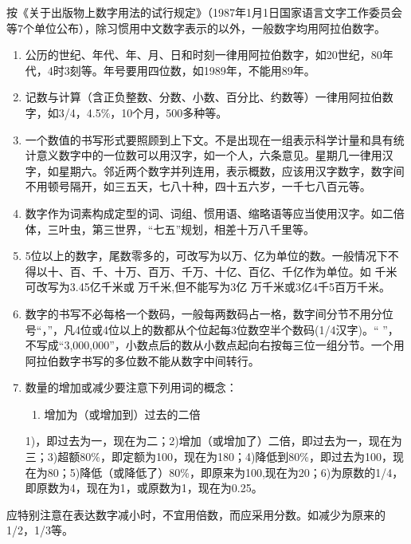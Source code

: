 
按《关于出版物上数字用法的试行规定》（1987年1月1日国家语言文字工作委员会等7个单位公布），除习惯用中文数字表示的以外，一般数字均用阿拉伯数字。
\begin{enumerate}%
	\item 公历的世纪、年代、年、月、日和时刻一律用阿拉伯数字，如20世纪，80年代，4时3刻等。年号要用四位数，如1989年，不能用89年。
	\item 记数与计算（含正负整数、分数、小数、百分比、约数等）一律用阿拉伯数字，如3/4，4.5\%，10个月，500多种等。
	\item 一个数值的书写形式要照顾到上下文。不是出现在一组表示科学计量和具有统计意义数字中的一位数可以用汉字，如一个人，六条意见。星期几一律用汉字，如星期六。邻近两个数字并列连用，表示概数，应该用汉字数字，数字间不用顿号隔开，如三五天，七八十种，四十五六岁，一千七八百元等。
	\item 数字作为词素构成定型的词、词组、惯用语、缩略语等应当使用汉字。如二倍体，三叶虫，第三世界，“七五”规划，相差十万八千里等。
	\item 5位以上的数字，尾数零多的，可改写为以万、亿为单位的数。一般情况下不得以十、百、千、十万、百万、千万、十亿、百亿、千亿作为单位。如 千米可改写为3.45亿千米或 万千米,但不能写为3亿 万千米或3亿4千5百万千米。
	\item 数字的书写不必每格一个数码，一般每两数码占一格，数字间分节不用分位号“，”，凡4位或4位以上的数都从个位起每3位数空半个数码(1/4汉字)。“ ”，不写成“3,000,000”，小数点后的数从小数点起向右按每三位一组分节。一个用阿拉伯数字书写的多位数不能从数字中间转行。
	\item 数量的增加或减少要注意下列用词的概念：
	\begin{enumerate}[1)]
		\item 增加为（或增加到）过去的二倍
	\end{enumerate}
	1)，即过去为一，现在为二；2)增加（或增加了）二倍，即过去为一，现在为三；3)超额80\%，即定额为100，现在为180；4)降低到80\%，即过去为100，现在为80；5)降低（或降低了）80\%，即原来为100,现在为20；6)为原数的1/4，即原数为4，现在为1，或原数为1，现在为0.25。
\end{enumerate}


应特别注意在表达数字减小时，不宜用倍数，而应采用分数。如减少为原来的1/2，1/3等。
